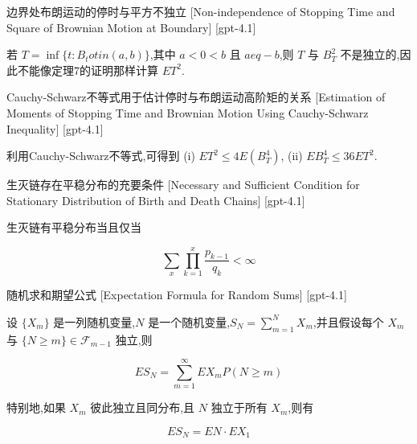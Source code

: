\documentclass[UTF8]{ctexart}
\begin{document}
    
    
    \begin{ppt}
        {边界处布朗运动的停时与平方不独立}
        [Non-independence of Stopping Time and Square of Brownian Motion at Boundary]
        [gpt-4.1]
        
若 $T = \operatorname*{inf} \{ t : B_{t} 
otin ( a, b ) \}$,其中 $a < 0 < b$ 且 $a 
eq -b$,则 $T$ 与 $B_{T}^{2}$ 不是独立的,因此不能像定理7的证明那样计算 $E T^{2}$.

    \end{ppt}
    
    
    
    \begin{ppt}
        {Cauchy-Schwarz不等式用于估计停时与布朗运动高阶矩的关系}
        [Estimation of Moments of Stopping Time and Brownian Motion Using Cauchy-Schwarz Inequality]
        [gpt-4.1]
        
利用Cauchy-Schwarz不等式,可得到
(i) $E T^{2} \leq 4 E ( B_{T}^{4} )$,
(ii) $E B_{T}^{4} \leq 36 E T^{2}$.

    \end{ppt}
    
    
    
    \begin{thm}
        {生灭链存在平稳分布的充要条件}
        [Necessary and Sufficient Condition for Stationary Distribution of Birth and Death Chains]
        [gpt-4.1]
        
生灭链有平稳分布当且仅当

\[
\sum_{x} \prod_{k=1}^{x} \frac{p_{k-1}}{q_{k}} < \infty
\]

    \end{thm}
    
    
    
    \begin{thm}
        {随机求和期望公式}
        [Expectation Formula for Random Sums]
        [gpt-4.1]
        
设 $\{X_m\}$ 是一列随机变量,$N$ 是一个随机变量,$S_N=\sum_{m=1}^{N} X_m$,并且假设每个 $X_m$ 与 $\{N \geq m\}\in \mathcal{F}_{m-1}$ 独立,则

\[
E S_{N} = \sum_{m=1}^{\infty} E X_{m} P(N \geq m)
\]

特别地,如果 $X_m$ 彼此独立且同分布,且 $N$ 独立于所有 $X_m$,则有

\[
E S_{N} = E N \cdot E X_1
\]

    \end{thm}
    
\end{document}
